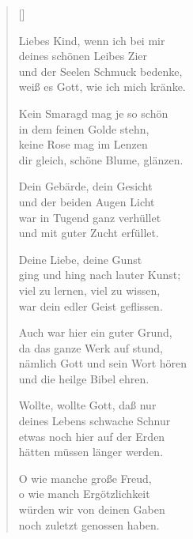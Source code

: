 \begin{multicols}{2}
\settowidth{\versewidth}{Liebes Kind, wenn ich bei mir}
\begin{verse}[\versewidth]

 Liebes Kind, wenn ich bei mir\\
deines schönen Leibes Zier\\
und der Seelen Schmuck bedenke,\\
weiß es Gott, wie ich mich kränke.

 Kein Smaragd mag je so schön\\
in dem feinen Golde stehn,\\
keine Rose mag im Lenzen\\
dir gleich, schöne Blume, glänzen.

 Dein Gebärde, dein Gesicht\\
und der beiden Augen Licht\\
war in Tugend ganz verhüllet\\
und mit guter Zucht erfüllet.

 Deine Liebe, deine Gunst\\
ging und hing nach lauter Kunst;\\
viel zu lernen, viel zu wissen,\\
war dein edler Geist geflissen.

 Auch war hier ein guter Grund,\\
da das ganze Werk auf stund,\\
nämlich Gott und sein Wort hören\\
und die heilge Bibel ehren.

 Wollte, wollte Gott, daß nur\\
deines Lebens schwache Schnur\\
etwas noch hier auf der Erden\\
hätten müssen länger werden.

 O wie manche große Freud,\\
o wie manch Ergötzlichkeit\\
würden wir von deinen Gaben\\
noch zuletzt genossen haben.


\end{verse}
\end{multicols}
